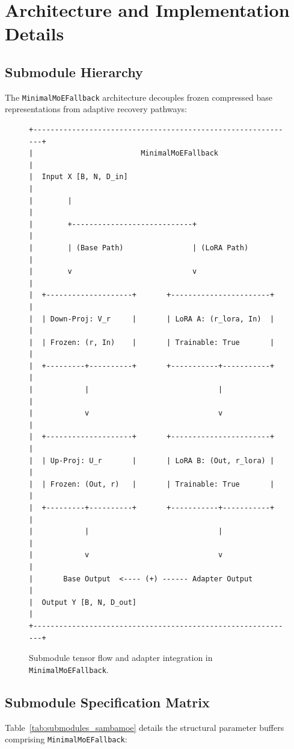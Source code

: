 \section{Architecture and Implementation Details}

\subsection{Submodule Hierarchy}
The \texttt{MinimalMoEFallback} architecture decouples frozen compressed base representations from adaptive recovery pathways:

\begin{figure}[H]
\centering
\begin{verbatim}
+-------------------------------------------------------------+
|                         MinimalMoEFallback                  |
|  Input X [B, N, D_in]                                       |
|        |                                                    |
|        +----------------------------+                       |
|        | (Base Path)                | (LoRA Path)           |
|        v                            v                       |
|  +--------------------+       +-----------------------+     |
|  | Down-Proj: V_r     |       | LoRA A: (r_lora, In)  |     |
|  | Frozen: (r, In)    |       | Trainable: True       |     |
|  +---------+----------+       +-----------+-----------+     |
|            |                              |                 |
|            v                              v                 |
|  +--------------------+       +-----------------------+     |
|  | Up-Proj: U_r       |       | LoRA B: (Out, r_lora) |     |
|  | Frozen: (Out, r)   |       | Trainable: True       |     |
|  +---------+----------+       +-----------+-----------+     |
|            |                              |                 |
|            v                              v                 |
|       Base Output  <---- (+) ------ Adapter Output          |
|  Output Y [B, N, D_out]                                     |
+-------------------------------------------------------------+
\end{verbatim}
\caption{Submodule tensor flow and adapter integration in \texttt{MinimalMoEFallback}.}
\end{figure}

\subsection{Submodule Specification Matrix}
Table~\ref{tab:submodules_sambamoe} details the structural parameter buffers comprising \texttt{MinimalMoEFallback}:

